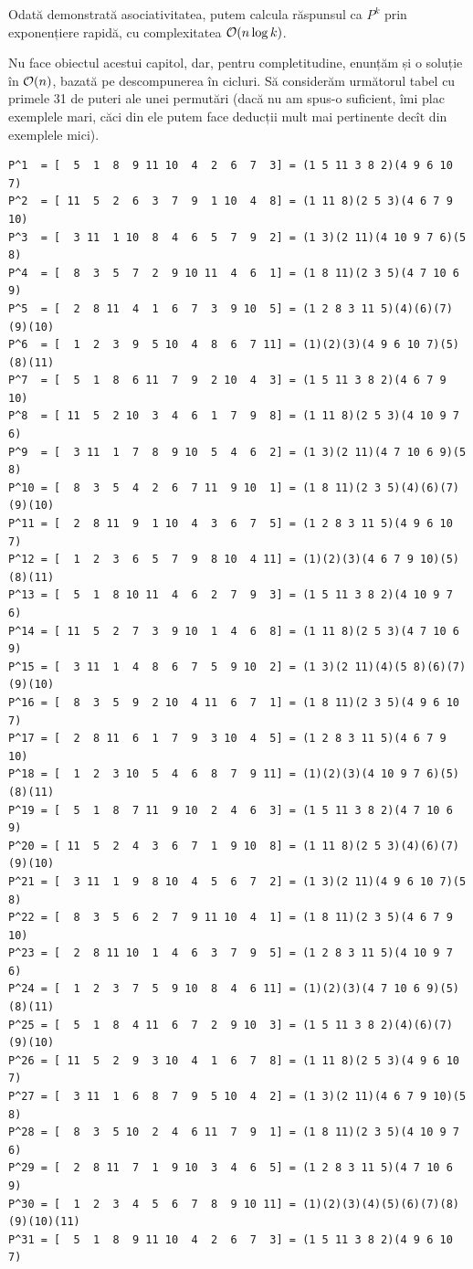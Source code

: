 \documentclass[../main.tex]{subfiles}
\begin{document}
Odată demonstrată asociativitatea, putem calcula răspunsul ca $P^k$ prin exponențiere rapidă, cu complexitatea $\mathcal{O}(n \log k)$.

Nu face obiectul acestui capitol, dar, pentru completitudine, enunțăm și o soluție în $\mathcal{O}(n)$, bazată pe descompunerea în cicluri. Să considerăm următorul tabel cu primele 31 de puteri ale unei permutări (dacă nu am spus-o suficient, îmi plac exemplele mari, căci din ele putem face deducții mult mai pertinente decît din exemplele mici).

\begin{verbatim}
P^1  = [  5  1  8  9 11 10  4  2  6  7  3] = (1 5 11 3 8 2)(4 9 6 10 7)
P^2  = [ 11  5  2  6  3  7  9  1 10  4  8] = (1 11 8)(2 5 3)(4 6 7 9 10)
P^3  = [  3 11  1 10  8  4  6  5  7  9  2] = (1 3)(2 11)(4 10 9 7 6)(5 8)
P^4  = [  8  3  5  7  2  9 10 11  4  6  1] = (1 8 11)(2 3 5)(4 7 10 6 9)
P^5  = [  2  8 11  4  1  6  7  3  9 10  5] = (1 2 8 3 11 5)(4)(6)(7)(9)(10)
P^6  = [  1  2  3  9  5 10  4  8  6  7 11] = (1)(2)(3)(4 9 6 10 7)(5)(8)(11)
P^7  = [  5  1  8  6 11  7  9  2 10  4  3] = (1 5 11 3 8 2)(4 6 7 9 10)
P^8  = [ 11  5  2 10  3  4  6  1  7  9  8] = (1 11 8)(2 5 3)(4 10 9 7 6)
P^9  = [  3 11  1  7  8  9 10  5  4  6  2] = (1 3)(2 11)(4 7 10 6 9)(5 8)
P^10 = [  8  3  5  4  2  6  7 11  9 10  1] = (1 8 11)(2 3 5)(4)(6)(7)(9)(10)
P^11 = [  2  8 11  9  1 10  4  3  6  7  5] = (1 2 8 3 11 5)(4 9 6 10 7)
P^12 = [  1  2  3  6  5  7  9  8 10  4 11] = (1)(2)(3)(4 6 7 9 10)(5)(8)(11)
P^13 = [  5  1  8 10 11  4  6  2  7  9  3] = (1 5 11 3 8 2)(4 10 9 7 6)
P^14 = [ 11  5  2  7  3  9 10  1  4  6  8] = (1 11 8)(2 5 3)(4 7 10 6 9)
P^15 = [  3 11  1  4  8  6  7  5  9 10  2] = (1 3)(2 11)(4)(5 8)(6)(7)(9)(10)
P^16 = [  8  3  5  9  2 10  4 11  6  7  1] = (1 8 11)(2 3 5)(4 9 6 10 7)
P^17 = [  2  8 11  6  1  7  9  3 10  4  5] = (1 2 8 3 11 5)(4 6 7 9 10)
P^18 = [  1  2  3 10  5  4  6  8  7  9 11] = (1)(2)(3)(4 10 9 7 6)(5)(8)(11)
P^19 = [  5  1  8  7 11  9 10  2  4  6  3] = (1 5 11 3 8 2)(4 7 10 6 9)
P^20 = [ 11  5  2  4  3  6  7  1  9 10  8] = (1 11 8)(2 5 3)(4)(6)(7)(9)(10)
P^21 = [  3 11  1  9  8 10  4  5  6  7  2] = (1 3)(2 11)(4 9 6 10 7)(5 8)
P^22 = [  8  3  5  6  2  7  9 11 10  4  1] = (1 8 11)(2 3 5)(4 6 7 9 10)
P^23 = [  2  8 11 10  1  4  6  3  7  9  5] = (1 2 8 3 11 5)(4 10 9 7 6)
P^24 = [  1  2  3  7  5  9 10  8  4  6 11] = (1)(2)(3)(4 7 10 6 9)(5)(8)(11)
P^25 = [  5  1  8  4 11  6  7  2  9 10  3] = (1 5 11 3 8 2)(4)(6)(7)(9)(10)
P^26 = [ 11  5  2  9  3 10  4  1  6  7  8] = (1 11 8)(2 5 3)(4 9 6 10 7)
P^27 = [  3 11  1  6  8  7  9  5 10  4  2] = (1 3)(2 11)(4 6 7 9 10)(5 8)
P^28 = [  8  3  5 10  2  4  6 11  7  9  1] = (1 8 11)(2 3 5)(4 10 9 7 6)
P^29 = [  2  8 11  7  1  9 10  3  4  6  5] = (1 2 8 3 11 5)(4 7 10 6 9)
P^30 = [  1  2  3  4  5  6  7  8  9 10 11] = (1)(2)(3)(4)(5)(6)(7)(8)(9)(10)(11)
P^31 = [  5  1  8  9 11 10  4  2  6  7  3] = (1 5 11 3 8 2)(4 9 6 10 7)
\end{verbatim}
\end{document}
